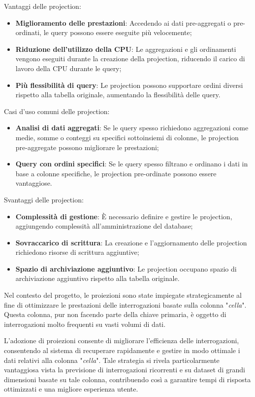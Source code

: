 Vantaggi delle projection:
\begin{itemize}
  \item \textbf{Miglioramento delle prestazioni}: Accedendo ai dati pre-aggregati o pre-ordinati, le query possono essere eseguite più velocemente;
  \item \textbf{Riduzione dell'utilizzo della CPU}: Le aggregazioni e gli ordinamenti vengono eseguiti durante la creazione della projection, riducendo il carico di lavoro della CPU durante le query;
  \item \textbf{Più flessibilità di query}: Le projection possono supportare ordini diversi rispetto alla tabella originale, aumentando la flessibilità delle query.
\end{itemize}
Casi d'uso comuni delle projection:
\begin{itemize}
  \item \textbf{Analisi di dati aggregati}: Se le query spesso richiedono aggregazioni come medie, somme o conteggi su specifici sottoinsiemi di colonne, le projection pre-aggregate possono migliorare le prestazioni;
  \item \textbf{Query con ordini specifici}: Se le query spesso filtrano e ordinano i dati in base a colonne specifiche, le projection pre-ordinate possono essere vantaggiose.
\end{itemize}

Svantaggi delle projection:
\begin{itemize}
  \item \textbf{Complessità di gestione}: È necessario definire e gestire le projection, aggiungendo complessità all'amministrazione del database;
  \item \textbf{Sovraccarico di scrittura}: La creazione e l'aggiornamento delle projection richiedono risorse di scrittura aggiuntive;
  \item \textbf{Spazio di archiviazione aggiuntivo}: Le projection occupano spazio di archiviazione aggiuntivo rispetto alla tabella originale.
\end{itemize}

Nel contesto del progetto, le proiezioni sono state impiegate strategicamente al fine di ottimizzare le prestazioni delle interrogazioni basate sulla colonna "\textit{cella}". Questa colonna, pur non facendo parte della chiave primaria, è oggetto di interrogazioni molto frequenti su vasti volumi di dati.

L'adozione di proiezioni consente di migliorare l'efficienza delle interrogazioni, consentendo al sistema di recuperare rapidamente e gestire in modo ottimale i dati relativi alla colonna "\textit{cella}". Tale strategia si rivela particolarmente vantaggiosa vista la previsione di interrogazioni ricorrenti e su dataset di grandi dimensioni basate su tale colonna, contribuendo così a garantire tempi di risposta ottimizzati e una migliore esperienza utente.


